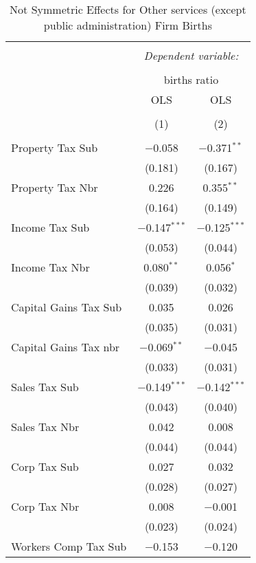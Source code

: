 
\begin{table}[!htbp] \centering 
  \caption{Not Symmetric Effects for  Other services (except public administration) Firm Births} 
  \label{81noequality} 
\footnotesize 
\begin{tabular}{@{\extracolsep{5pt}}lcc} 
\\[-1.8ex]\hline 
\hline \\[-1.8ex] 
 & \multicolumn{2}{c}{\textit{Dependent variable:}} \\ 
\cline{2-3} 
\\[-1.8ex] & \multicolumn{2}{c}{births ratio} \\ 
 & OLS & OLS \\ 
\\[-1.8ex] & (1) & (2)\\ 
\hline \\[-1.8ex] 
 Property Tax Sub & $-$0.058 & $-$0.371$^{**}$ \\ 
  & (0.181) & (0.167) \\ 
  Property Tax Nbr & 0.226 & 0.355$^{**}$ \\ 
  & (0.164) & (0.149) \\ 
  Income Tax Sub & $-$0.147$^{***}$ & $-$0.125$^{***}$ \\ 
  & (0.053) & (0.044) \\ 
  Income Tax Nbr & 0.080$^{**}$ & 0.056$^{*}$ \\ 
  & (0.039) & (0.032) \\ 
  Capital Gains Tax Sub & 0.035 & 0.026 \\ 
  & (0.035) & (0.031) \\ 
  Capital Gains Tax nbr & $-$0.069$^{**}$ & $-$0.045 \\ 
  & (0.033) & (0.031) \\ 
  Sales Tax Sub & $-$0.149$^{***}$ & $-$0.142$^{***}$ \\ 
  & (0.043) & (0.040) \\ 
  Sales Tax Nbr & 0.042 & 0.008 \\ 
  & (0.044) & (0.044) \\ 
  Corp Tax Sub & 0.027 & 0.032 \\ 
  & (0.028) & (0.027) \\ 
  Corp Tax Nbr & 0.008 & $-$0.001 \\ 
  & (0.023) & (0.024) \\ 
  Workers Comp Tax Sub & $-$0.153 & $-$0.120 \\ 

\end{tabular}
\end{table}
